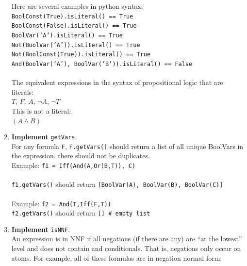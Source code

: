 \documentclass[12pt]{article}
\newenvironment{problem}[2][Problem]{\begin{trivlist}
\item[\hskip \labelsep {\bfseries #1}\hskip \labelsep {\bfseries #2.}]}{\end{trivlist}}
\begin{document}
\begin{problem}{2}
\begin{enumerate}[label=\Alph*.]
Here are several examples in python syntax: \\

\texttt{BoolConst(True).isLiteral() == True} \\
\texttt{BoolConst(False).isLiteral() == True} \\
\texttt{BoolVar('A').isLiteral() == True} \\
\texttt{Not(BoolVar('A')).isLiteral() == True} \\
\texttt{Not(BoolConst(True)).isLiteral() == True} \\
\texttt{And(BoolVar('A'), BoolVar('B')).isLiteral() == False} \\ \\

The equivalent expressions in the syntax of propositional logic that are literals: \\


$T$, $F$, $A$, $\neg A$, $\neg T$ \\

This is not a literal: \\

$(A \land B)$ \\


\item \textbf{Implement} \texttt{getVars}. \\


For any formula \texttt{F}, \texttt{F.getVars()} should return a list of all unique BoolVars in the expression. there should not be duplicates. \\

Example: \texttt{f1 = Iff(And(A,Or(B,T)), C)} \\ \\

\texttt{f1.getVars()} should return \texttt{[BoolVar(A), BoolVar(B), BoolVar(C)]} \\ \\

Example: \texttt{f2 = And(T,Iff(F,T))} \\ 
\texttt{f2.getVars()} should return \texttt{[] \# empty list}

\item \textbf{Implement} \texttt{isNNF}. \\

An expression is in NNF if all negations (if there are any) are ``at the lowest'' level and does not contain and conditionals. That is, negations only occur on atoms. For example, all of these formulas are in negation normal form:


\end{enumerate}
\end{problem}
\end{document}
